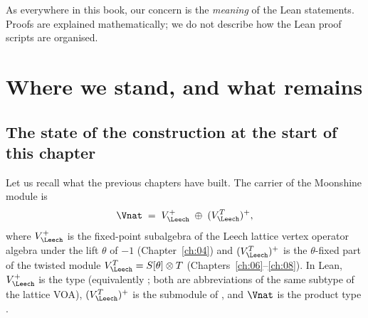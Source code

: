 As everywhere in this book, our concern is the \emph{meaning} of the Lean statements.  Proofs are
explained mathematically; we do not describe how the Lean proof scripts are organised.

\section{Where we stand, and what remains}\label{ch14:sec:intro}

\subsection{The state of the construction at the start of this chapter}

Let us recall what the previous chapters have built.  The carrier of the Moonshine module is
\begin{equation*}
  \Vnat \;=\; V_{\Leech}^{+}\;\oplus\;(V_{\Leech}^{T})^{+},
\end{equation*}
where $V_\Leech^+$ is the fixed-point subalgebra of the Leech lattice vertex operator algebra under
the lift $\theta$ of $-1$ (Chapter~\ref{ch:04}) and $(V_\Leech^T)^+$ is the $\theta$-fixed part of
the twisted module $V_\Leech^T=S[\theta]\otimes T$ (Chapters~\ref{ch:06}--\ref{ch:08}).  In Lean,
$V_\Leech^+$ is the type  (equivalently ; both are abbreviations of the
same subtype of the lattice VOA), $(V_\Leech^T)^+$ is the submodule  of
, and $\Vnat$ is the product type .

